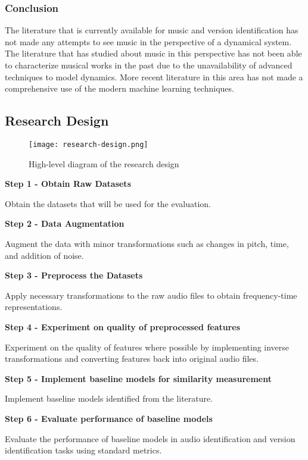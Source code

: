 \documentclass[../main.tex]{subfiles}
\begin{document}
\subsubsection{Conclusion}
\par
The literature that is currently available for music and version identification has not made any attempts to see music in the perspective of a dynamical system. The literature that has studied about music in this perspective has not been able to characterize musical works in the past due to the unavailability of advanced techniques to model dynamics. More recent literature in this area has not made a comprehensive use of the modern machine learning techniques.

\subsection{Research Design}

\begin{figure}[H]
    \centering
    \texttt{[image: research-design.png]}
    \caption{High-level diagram of the research design}
    \label{fig:research-design}
\end{figure}

\textbf{Step 1 - Obtain Raw Datasets}
\par
Obtain the datasets that will be used for the evaluation.

\textbf{Step 2 - Data Augmentation}
\par
Augment the data with minor transformations such as changes in pitch, time, and addition of noise.

\textbf{Step 3 - Preprocess the Datasets}
\par
Apply necessary transformations to the raw audio files to obtain frequency-time representations.

\textbf{Step 4 - Experiment on quality of preprocessed features}
\par
Experiment on the quality of features where possible by implementing inverse transformations and converting features back into original audio files.

\textbf{Step 5 - Implement baseline models for similarity measurement}
\par
Implement baseline models identified from the literature.

\textbf{Step 6 - Evaluate performance of baseline models}
\par
Evaluate the performance of baseline models in audio identification and version identification tasks using standard metrics.
\end{document}
